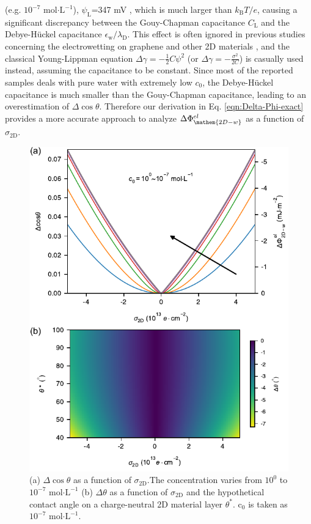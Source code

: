 \documentclass[aps,prl,reprint,groupedaddress,amsmath,amssymb, showpacs]{revtex4-1}
\begin{document}
(e.g. \(10^{-7}\) mol\(\cdot \mathrm{L}^{-1}\)),
\(\psi_{\mathrm{L}}\)=347 mV
, which is much larger than \(k_{\mathrm{B}}T/e\), causing a significant
discrepancy between the Gouy-Chapman capacitance \(C_{\mathrm{L}}\) and
the Debye-Hückel capacitance
\(\epsilon_{\mathrm{w}}/\lambda_{\mathrm{D}}\). This effect is often
ignored in previous studies concerning the electrowetting on graphene
and other 2D materials
\cite{ostrowski_tunable_2014,daub_electrowetting_2007,goniszewski_correlation_2016,ashraf_doping-induced_2016},
and the classical Young-Lippman equation \(\Delta
\gamma=-\frac{1}{2}C\psi^{2}\) (or \(\Delta
\gamma=-\frac{\sigma^{2}}{2C}\)) is casually used instead, assuming the
capacitance to be constant. Since most of the reported samples deals with pure water with extremely low \(c_{0}\), the Debye-Hückel capacitance is much smaller than the Gouy-Chapman capacitance, leading to an overestimation of \(\Delta\cos\theta\). Therefore our
derivation in Eq. \ref{eqn:Delta-Phi-exact} provides a more accurate
approach to analyze \(\Delta \Phi_{\mathem{2D-w}}^{el}\) as a function of \(\sigma_{\mathrm{2D}}\).

\begin{figure}[htbp]
\centering
\includegraphics[width=0.85\linewidth]{../img/2d-ph-dependency.pdf}
\caption{\label{fig:Delta-cos-dependency}
(a) \(\Delta\cos\theta\) as a function of \(\sigma_{\mathrm{2D}}\).The concentration varies from \(10^{0}\) to \(10^{-7}\) mol\(\cdot\mathrm{L}^{-1}\) (b) \(\Delta\theta\) as a function of \(\sigma_{\mathrm{2D}}\) and the hypothetical contact angle on a charge-neutral 2D material layer \(\theta^{*}\). c\(_{\text{0}}\) is taken as \(10^{-7}\) mol\(\cdot\mathrm{L}^{-1}\).}
\end{figure}
\end{document}
